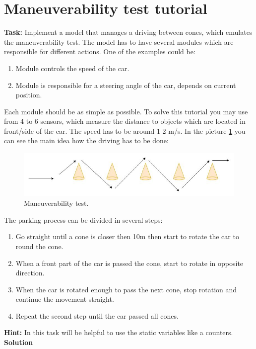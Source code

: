 \section{Maneuverability test tutorial}
\textbf{Task:} Implement a model that manages a driving between cones, which emulates the maneuverability test. The model has to have several modules which are responsible for different actions. One of the examples could be:
\begin{enumerate}
    \item Module controls the speed of the car.
    \item Module is responsible for a steering angle of the car, depends on current position.
\end{enumerate}
Each module should be as simple as possible.
To solve this tutorial you may use from 4 to 6 sensors, which measure the distance to objects which are located in front/side of the car. The speed has to be around 1-2 m/s. In the picture \ref{fig:maneuverability} you can see the main idea how the driving has to be done:
\begin{figure}[h!]
    \centering
    \includegraphics[width=\linewidth]{src/pic/drive_cones}
    \caption{Maneuverability test.}
    \label{fig:maneuverability}
\end{figure} 
The parking process can be divided in several steps:
\begin{enumerate}
    \item Go straight until a cone is closer then 10m then start to rotate the car to round the cone.
    \item When a front part of the car is passed the cone, start to rotate in opposite direction.
    \item When the car is rotated enough to pass the next cone, stop rotation and continue the movement straight.
    \item Repeat the second step until the car passed all cones.
\end{enumerate}
\textbf{Hint:} In this task will be helpful to use the static variables like a counters. \newline \newline
\textbf{Solution} \newline \newline
